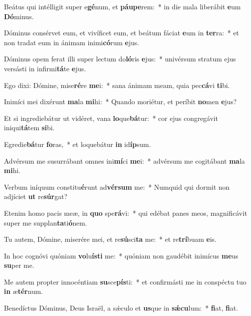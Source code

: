 \item Beátus qui intélligit super e\textbf{gé}num, et \textbf{páu}\textbf{pe}rem:~* in die mala liberábit \textbf{e}um \textbf{Dó}minus.
\item Dóminus consérvet eum, et vivíficet eum, et beátum fáciat \textbf{e}um in \textbf{ter}ra:~* et non tradat eum in ánimam inimi\textbf{có}rum \textbf{e}jus.
\item Dóminus opem ferat illi super lectum do\textbf{ló}ris \textbf{e}jus:~* univérsum stratum ejus versásti in infirmi\textbf{tá}te \textbf{e}jus.
\item Ego dixi: Dómine, mise\textbf{ré}re \textbf{me}i:~* sana ánimam meam, quia pec\textbf{cá}vi \textbf{ti}bi.
\item Inimíci mei dixérunt \textbf{ma}la \textbf{mi}hi:~* Quando moriétur, et períbit \textbf{no}men \textbf{e}jus?
\item Et si ingrediebátur ut vidéret, vana \textbf{lo}que\textbf{bá}tur:~* cor ejus congregávit iniqui\textbf{tá}tem \textbf{si}bi.
\item Egredie\textbf{bá}tur \textbf{fo}ras,~* et loquebátur \textbf{in} id\textbf{íp}sum.
\item Advérsum me susurrábant omnes ini\textbf{mí}ci \textbf{me}i:~* advérsum me cogitábant \textbf{ma}la \textbf{mi}hi.
\item Verbum iníquum constitu\textbf{é}runt ad\textbf{vér}\textbf{sum} me:~* Numquid qui dormit non adjíciet \textbf{ut} re\textbf{súr}gat?
\item Etenim homo pacis meæ, in \textbf{quo} spe\textbf{rá}vi:~* qui edébat panes meos, magnificávit super me supplan\textbf{ta}ti\textbf{ó}nem.
\item Tu autem, Dómine, miserére mei, et re\textbf{sú}sci\textbf{ta} me:~* et re\textbf{trí}buam \textbf{e}is.
\item In hoc cognóvi quóniam \textbf{vo}lu\textbf{ís}\textbf{ti} me:~* quóniam non gaudébit inimícus \textbf{me}us \textbf{su}per me.
\item Me autem propter innocéntiam \textbf{su}sce\textbf{pís}ti:~* et confirmásti me in conspéctu tuo \textbf{in} æ\textbf{tér}num.
\item Benedíctus Dóminus, Deus Israël, a sǽculo et \textbf{us}que in \textbf{sǽ}\textbf{cu}lum:~* \textbf{fi}at, \textbf{fi}at.
